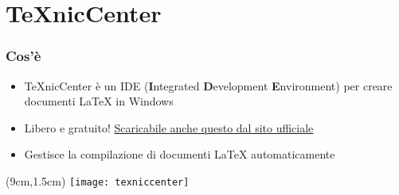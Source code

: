 \section{TeXnicCenter}
  \begin{frame}
    \frametitle{Cos'è}
    
    \begin{itemize}
      \item TeXnicCenter è un IDE (\textbf{I}ntegrated \textbf{D}evelopment 
\textbf{E}nvironment) per creare documenti \LaTeX{} in Windows
      \item Libero e gratuito! 
\href{http://www.texniccenter.org/download/}{Scaricabile anche questo dal sito 
ufficiale}
      \item Gestisce la compilazione di documenti \LaTeX{} automaticamente
    \end{itemize}
    
    \begin{textblock*}{5cm}(9cm,1.5cm)
      \texttt{[image: texniccenter]}
    \end{textblock*}

  \end{frame}
